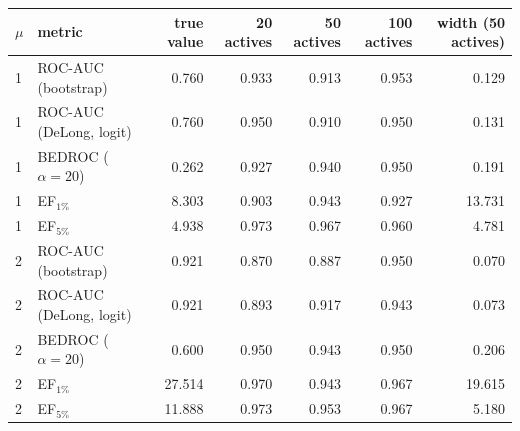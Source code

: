 \begin{tabular}{llrrrrr}
\toprule
$\mu$ & metric & true value & 20 actives & 50 actives & 100 actives & width (50 actives) \\
\midrule
1 & ROC-AUC (bootstrap) & 0.760 & 0.933 & 0.913 & 0.953 & 0.129 \\
1 & ROC-AUC (DeLong, logit) & 0.760 & 0.950 & 0.910 & 0.950 & 0.131 \\
1 & BEDROC ($\alpha=20$) & 0.262 & 0.927 & 0.940 & 0.950 & 0.191 \\
1 & EF$_{1\%}$ & 8.303 & 0.903 & 0.943 & 0.927 & 13.731 \\
1 & EF$_{5\%}$ & 4.938 & 0.973 & 0.967 & 0.960 & 4.781 \\
\midrule
2 & ROC-AUC (bootstrap) & 0.921 & 0.870 & 0.887 & 0.950 & 0.070 \\
2 & ROC-AUC (DeLong, logit) & 0.921 & 0.893 & 0.917 & 0.943 & 0.073 \\
2 & BEDROC ($\alpha=20$) & 0.600 & 0.950 & 0.943 & 0.950 & 0.206 \\
2 & EF$_{1\%}$ & 27.514 & 0.970 & 0.943 & 0.967 & 19.615 \\
2 & EF$_{5\%}$ & 11.888 & 0.973 & 0.953 & 0.967 & 5.180 \\
\bottomrule
\end{tabular}
